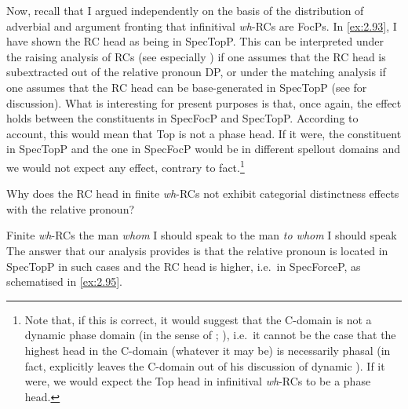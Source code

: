\documentclass[output=paper]{langsci/langscibook}
\begin{document}
Now, recall that I argued independently on the basis of the distribution of
adverbial and argument fronting that infinitival \emph{wh}-\glspl{RC} are FocPs. In
\eqref{ex:2.93}, I have shown the \gls{RC} head as being in SpecTopP\@. This
can be interpreted under the raising analysis of \glspl{RC} (see especially
\citealt{Bianchi1999,Bianchi2000}) if one assumes that the \gls{RC} head is
subextracted out of the relative pronoun DP, or under the matching analysis if
one assumes that the \gls{RC} head can be base-generated in SpecTopP (see
\citealt{Douglas2016} for discussion). What is interesting for present purposes
is that, once again, the  effect holds between the
constituents in SpecFocP and SpecTopP\@.  According to 
account, this would mean that Top is not a phase head. If it were, the
constituent in SpecTopP and the one in SpecFocP would be in different spellout
domains and we would not expect any  effect, contrary to
fact.\footnote{Note that, if this is correct, it would suggest that the
    C-domain is not a dynamic phase domain (in the sense of
    \citealt{Boskovic2014}; \citealt{Harwood2015}), i.e.\ it cannot be the case that the highest head
    in the C-domain (whatever it may be) is necessarily phasal (in fact,
    \citealt{Boskovic2014} explicitly leaves the C-domain out of his discussion of
    dynamic ). If it were, we would expect the Top head in infinitival
\emph{wh}-\glspl{RC} to be a phase head.}

Why does the \gls{RC} head in finite \emph{wh}-\glspl{RC} not exhibit
categorial distinctness effects with the relative pronoun?

\ea\label{ex:2.94} Finite \emph{wh}-\glspl{RC}
    \ea     the man \textit{whom} I should speak to
    \ex    the man \textit{to whom} I should speak
    \z
\z
The answer that our analysis provides is that the relative pronoun is located
in SpecTopP in such cases and the \gls{RC} head is higher, i.e.\ in SpecForceP, as
schematised in \eqref{ex:2.95}.
\end{document}
